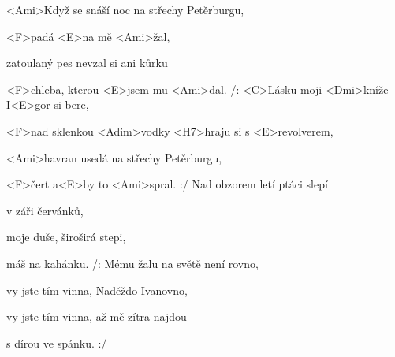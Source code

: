 

\zs
<Ami>Když se snáší noc na střechy Petěrburgu,

<F>padá <E>na mě <Ami>žal,

zatoulaný pes nevzal si ani kůrku

<F>chleba, kterou <E>jsem mu <Ami>dal.
\ks
\zr
/: <C>Lásku moji <Dmi>kníže I<E>gor si bere,


<F>nad sklenkou <Adim>vodky <H7>hraju si s <E>revolverem,

<Ami>havran usedá na střechy Petěrburgu,

<F>čert a<E>by to <Ami>spral. :/
\kr
\zs
Nad obzorem letí ptáci slepí

v záři červánků,

moje duše, široširá stepi,

máš na kahánku.
\ks
\zr
/: Mému žalu na světě není rovno,

vy jste tím vinna, Naděždo Ivanovno,

vy jste tím vinna, až mě zítra najdou

s dírou ve spánku. :/
\kr
\kp





